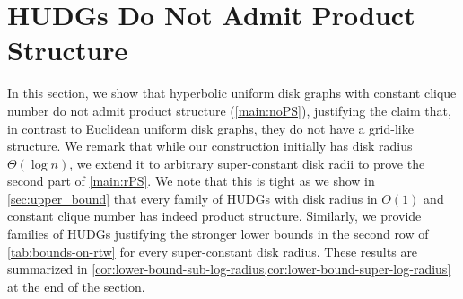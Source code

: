 \section{HUDGs Do Not Admit Product Structure}
\label{sec:large_radii}
\label{sec:lower_bound}
%
%     
%
In this section, we show that hyperbolic uniform disk graphs with constant clique number do not admit product structure (\cref{main:noPS}), justifying the claim that, in contrast to Euclidean uniform disk graphs, they do not have a grid-like structure.
We remark that while our construction initially has disk radius $ \Theta(\log n) $, 
we extend it to arbitrary super-constant disk radii to prove the second part of \cref{main:rPS}.
We note that this is tight as we show in \cref{sec:upper_bound} that every family of HUDGs with disk radius in $O(1)$ and constant clique number has indeed product structure.
Similarly, we provide families of HUDGs justifying the stronger lower bounds in the second row of \cref{tab:bounds-on-rtw} for every super-constant disk radius.
These results are summarized in \cref{cor:lower-bound-sub-log-radius,cor:lower-bound-super-log-radius} at the end of the section.
%
%
